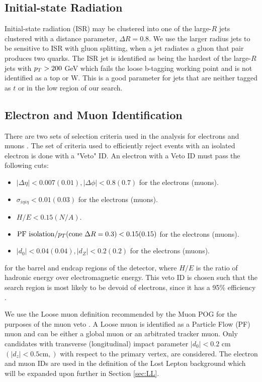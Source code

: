 \subsection{Initial-state Radiation}\label{ISRpt}

Initial-state radiation (ISR) may be clustered into one of the large-$R$ jets clustered with a distance parameter, $\Delta R=0.8$. We use the larger radius jets to be sensitive to ISR with gluon splitting, when a jet radiates a gluon that pair produces two quarks. The ISR jet is identified as being the hardest of the large-$R$ jets with $p_{T}>200$ GeV which fails the loose b-tagging working point and is not identified as a top or W. This is a good parameter for jets that are neither tagged as $t$ or \W{} in the low \dm{} region of our search.
 
\subsection{Electron and Muon Identification}\label{EleMuonID}
 There are two sets of selection criteria used in the analysis for electrons \cite{noauthor_performance_2015} and muons \cite{collaboration_performance_2013}. The set of criteria used to efficiently reject events with an isolated electron is done with a "Veto" ID. An electron with a Veto ID must pass the following cuts:
 \begin{itemize}
	 \item $|\Delta\eta|<0.007(0.01),|\Delta\phi|<0.8(0.7)$ for the electrons (muons).
	 \item $\sigma_{i\eta i\eta}<0.01(0.03)$ for the electrons (muons).
	 \item $H/E<0.15(N/A)$.
	 \item $\text{PF isolation}/p_{T}(\text{cone } \Delta R=0.3)<0.15(0.15)$ for the electrons (muons).
	 \item $|d_{0}|<0.04(0.04),|d_Z|<0.2(0.2)$ for the electrons (muons).
 \end{itemize}
 for the barrel and endcap regions of the detector, where $H/E$ is the ratio of hadronic energy over electromagnetic energy. This veto ID is chosen such that the search region is most likely to be devoid of electrons, since it has a 95\% efficiency \cite{noauthor_https://twiki.cern.ch/twiki/bin/view/cms/cutbasedelectronidentificationrun2_nodate}.
 
 We use the Loose muon definition recommended by the Muon POG for the purposes of the muon veto \cite{noauthor_https://twiki.cern.ch/twiki/bin/view/cmspublic/swguidemuonidloose_muon_nodate}. A Loose muon is identified as a Particle Flow (PF)\cite{noauthor_cms_nodate} muon and can be either a global muon or an arbitrated tracker muon. Only candidates with transverse (longitudinal) impact parameter $|d_0|<0.2$ cm $(|d_z|<0.5 \text{cm},)$ with respect to the primary vertex, are considered. The electron and muon IDs are used in the definition of the Lost Lepton background which will be expanded upon further in Section \ref{sec:LL}. 
 
